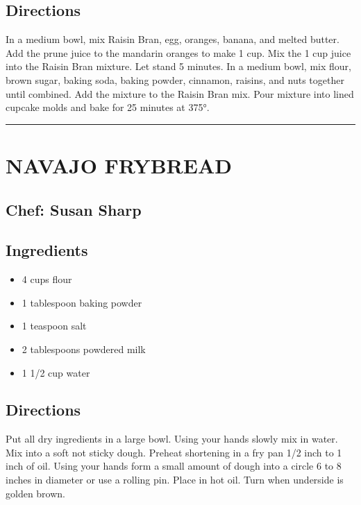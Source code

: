 \documentclass[
]{book}
\providecommand{\tightlist}{%
  \setlength{\itemsep}{0pt}\setlength{\parskip}{0pt}}
\begin{document}
\hypertarget{directions-78}{%
\subsection*{Directions}\label{directions-78}}


In a medium bowl, mix Raisin Bran, egg, oranges, banana, and melted butter. Add the prune juice to the mandarin oranges to make 1 cup. Mix the 1 cup juice into the Raisin Bran mixture. Let stand 5 minutes. In a medium bowl, mix flour, brown sugar, baking soda, baking powder, cinnamon, raisins, and nuts together until combined. Add the mixture to the Raisin Bran mix. Pour mixture into lined cupcake molds and bake for 25 minutes at 375°.

\begin{center}\rule{0.5\linewidth}{0.5pt}\end{center}

\hypertarget{navajo-frybread}{%
\section*{NAVAJO FRYBREAD}\label{navajo-frybread}}


\hypertarget{chef-susan-sharp}{%
\subsection*{Chef: Susan Sharp}\label{chef-susan-sharp}}


\hypertarget{ingredients-79}{%
\subsection*{Ingredients}\label{ingredients-79}}


\begin{itemize}
\tightlist
\item
  4 cups flour
\item
  1 tablespoon baking powder
\item
  1 teaspoon salt
\item
  2 tablespoons powdered milk
\item
  1 1/2 cup water
\end{itemize}

\hypertarget{directions-79}{%
\subsection*{Directions}\label{directions-79}}


Put all dry ingredients in a large bowl. Using your hands slowly mix in water. Mix into a soft not sticky dough. Preheat shortening in a fry pan 1/2 inch to 1 inch of oil. Using your hands form a small amount of dough into a circle 6 to 8 inches in diameter or use a rolling pin. Place in hot oil. Turn when underside is golden brown.
\end{document}

